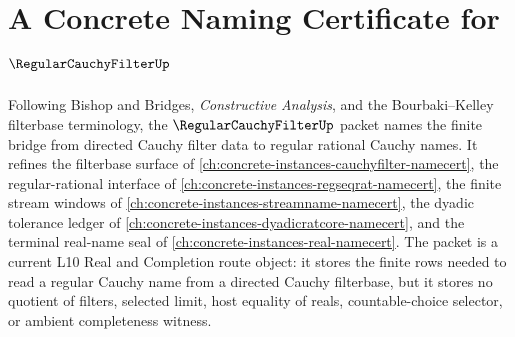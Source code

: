 \chapter{A Concrete Naming Certificate for $\RegularCauchyFilterUp$}
\label{ch:concrete-instances-regularcauchyfilter-namecert}

Following Bishop and Bridges, \emph{Constructive Analysis}, and the Bourbaki--Kelley filterbase terminology, the $\RegularCauchyFilterUp$ packet names the finite bridge from directed Cauchy filter data to regular rational Cauchy names. It refines the filterbase surface of \autoref{ch:concrete-instances-cauchyfilter-namecert}, the regular-rational interface of \autoref{ch:concrete-instances-regseqrat-namecert}, the finite stream windows of \autoref{ch:concrete-instances-streamname-namecert}, the dyadic tolerance ledger of \autoref{ch:concrete-instances-dyadicratcore-namecert}, and the terminal real-name seal of \autoref{ch:concrete-instances-real-namecert}. The packet is a current L10 Real and Completion route object: it stores the finite rows needed to read a regular Cauchy name from a directed Cauchy filterbase, but it stores no quotient of filters, selected limit, host equality of reals, countable-choice selector, or ambient completeness witness.

